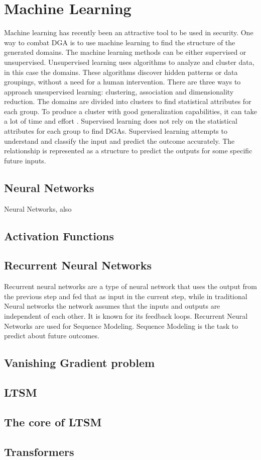 \section{Machine Learning}
Machine learning has recently been an attractive tool to be used in security. One way to combat DGA is to use machine learning to find the structure of the generated domains. The machine learning methods can be either supervised or unsupervised. Unsupervised learning uses algorithms to analyze and cluster data, in this case the domains. These algorithms discover hidden patterns or data groupings, without a need for a human intervention. There are three ways to approach unsupervised learning: clustering, association and dimensionality reduction. The domains are divided into clusters to find statistical attributes for each group. To produce a cluster with good generalization capabilities, it can take a lot of time and  effort \cite{unsupervised}. Supervised learning does not rely on the statistical attributes  for each group to find DGAs. Supervised learning attempts to understand and classify the input and predict the outcome accurately. The relationship is represented as a structure to predict the outputs for some specific future inputs.  
\subsection{Neural Networks}
Neural Networks, also 

\subsection{Activation Functions}


\subsection{Recurrent Neural Networks}
Recurrent neural networks are a type of neural network that uses the output from the previous step and fed that as input in the current step, while in traditional Neural networks the network assumes that the inputs and outputs are independent of each other. It is known for its feedback loops. Recurrent Neural Networks are used for Sequence Modeling. Sequence Modeling is the task to predict about future outcomes. 


\subsection{Vanishing Gradient problem}
\subsection{LTSM}
\subsection{The core of LTSM}
\subsection{Transformers}